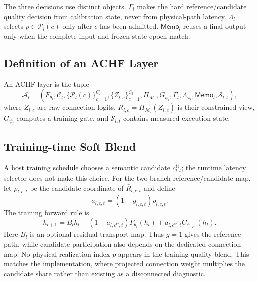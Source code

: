 \documentclass{article}
\newcommand{\achf}{\textsc{ACHF}}
\begin{document}
The three decisions use distinct objects. $\Gamma_l$ makes the hard
reference/candidate quality decision from calibration state, never from
physical-path latency. $\Lambda_l$ selects $p\in\mathcal{P}_l(c)$ only after
$c$ has been admitted. $\mathsf{Memo}_l$ reuses a final output only when the
complete input and frozen-state epoch match.

\subsection{Definition of an ACHF Layer}

An \achf{} layer is the tuple
\begin{equation}
\mathcal{A}_l=
\left(
F_{\theta_l},
\mathcal{C}_l,
\{\mathcal{P}_l(c)\}_{c=1}^{C_l},
\{Z_{l,c}\}_{c=1}^{C_l},
\Pi_{\mathcal{M}_l},
G_{\psi_l},
\Gamma_l,
\Lambda_{\omega_l},
\mathsf{Memo}_l,
\mathcal{S}_{l,t}
\right),
\label{eq:achf-tuple}
\end{equation}
where $Z_{l,c}$ are raw connection logits,
$\bar R_{l,c}=\Pi_{\mathcal{M}_l}(Z_{l,c})$ is their constrained view,
$G_{\psi_l}$ computes a training gate, and $\mathcal{S}_{l,t}$ contains
measured execution state.

\subsection{Training-time Soft Blend}

A host training schedule chooses a semantic candidate $c^{\mathrm{tr}}_{l,t}$;
the runtime latency selector does not make this choice. For the two-branch
reference/candidate map, let $\rho_{l,c,t}$ be the candidate coordinate of
$\bar R_{l,c,t}$ and define
\begin{equation}
a_{l,c,t}=(1-g_{l,c,t})\rho_{l,c,t}.
\label{eq:achf-candidate-mass}
\end{equation}
The training forward rule is
\begin{equation}
h_{l+1}
=B_lh_l
+(1-a_{l,c^{\mathrm{tr}},t})F_{\theta_l}(h_l)
+a_{l,c^{\mathrm{tr}},t}C_{\phi_{l,c^{\mathrm{tr}}}}(h_l).
\label{eq:achf-output}
\end{equation}
Here $B_l$ is an optional residual transport map. Thus $g=1$ gives the
reference path, while candidate participation also depends on the dedicated
connection map. No physical realization index $p$ appears in the training
quality blend. This matches the implementation, where projected connection
weight multiplies the candidate share rather than existing as a disconnected
diagnostic.
\end{document}
